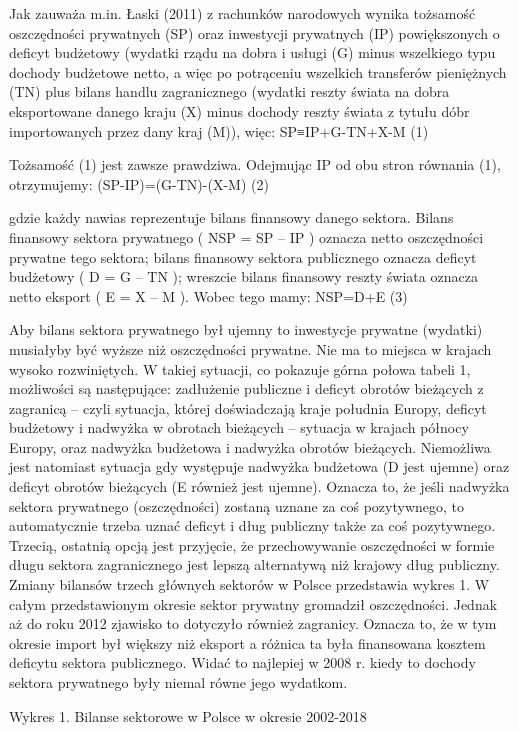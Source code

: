\documentclass[
]{book}
\begin{document}
Jak zauważa m.in. Łaski (2011) z rachunków narodowych wynika tożsamość oszczędności prywatnych (SP) oraz inwestycji prywatnych (IP) powiększonych o deficyt budżetowy (wydatki rządu na dobra i usługi (G) minus wszelkiego typu dochody budżetowe netto, a więc po potrąceniu wszelkich transferów pieniężnych (TN) plus bilans handlu zagranicznego (wydatki reszty świata na dobra eksportowane danego kraju (X) minus dochody reszty świata z tytułu dóbr importowanych przez dany kraj (M)), więc: SP≡IP+G-TN+X-M (1)

Tożsamość (1) jest zawsze prawdziwa. Odejmując IP od obu stron równania (1), otrzymujemy: (SP-IP)=(G-TN)-(X-M) (2)

gdzie każdy nawias reprezentuje bilans finansowy danego sektora. Bilans finansowy sektora prywatnego ( NSP = SP -- IP ) oznacza netto oszczędności prywatne tego sektora; bilans finansowy sektora publicznego oznacza deficyt budżetowy ( D = G -- TN ); wreszcie bilans finansowy reszty świata oznacza netto eksport ( E = X -- M ). Wobec tego mamy: NSP=D+E (3)

Aby bilans sektora prywatnego był ujemny to inwestycje prywatne (wydatki) musiałyby być wyższe niż oszczędności prywatne. Nie ma to miejsca w krajach wysoko rozwiniętych. W takiej sytuacji, co pokazuje górna połowa tabeli 1, możliwości są następujące: zadłużenie publiczne i deficyt obrotów bieżących z zagranicą -- czyli sytuacja, której doświadczają kraje południa Europy, deficyt budżetowy i nadwyżka w obrotach bieżących -- sytuacja w krajach północy Europy, oraz nadwyżka budżetowa i nadwyżka obrotów bieżących. Niemożliwa jest natomiast sytuacja gdy występuje nadwyżka budżetowa (D jest ujemne) oraz deficyt obrotów bieżących (E również jest ujemne). Oznacza to, że jeśli nadwyżka sektora prywatnego (oszczędności) zostaną uznane za coś pozytywnego, to automatycznie trzeba uznać deficyt i dług publiczny także za coś pozytywnego. Trzecią, ostatnią opcją jest przyjęcie, że przechowywanie oszczędności w formie długu sektora zagranicznego jest lepszą alternatywą niż krajowy dług publiczny. Zmiany bilansów trzech głównych sektorów w Polsce przedstawia wykres 1. W całym przedstawionym okresie sektor prywatny gromadził oszczędności. Jednak aż do roku 2012 zjawisko to dotyczyło również zagranicy. Oznacza to, że w tym okresie import był większy niż eksport a różnica ta była finansowana kosztem deficytu sektora publicznego. Widać to najlepiej w 2008 r. kiedy to dochody sektora prywatnego były niemal równe jego wydatkom.

Wykres 1. Bilanse sektorowe w Polsce w okresie 2002-2018
\end{document}
